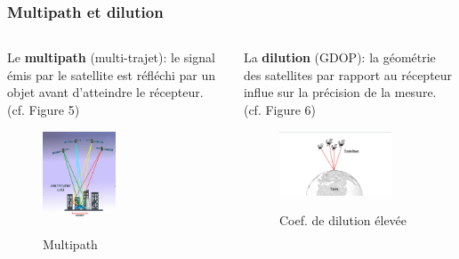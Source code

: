 \documentclass[xcolor=dvipsnames,envcountsect]{beamer}
\begin{document}
\begin{frame}
	\frametitle{Multipath et dilution}
	\justifying
	\begin{columns}
		\begin{column}{0.5\textwidth}
			Le \textbf{multipath} (multi-trajet): le signal émis par le satellite est réfléchi par un objet avant d'atteindre le récepteur. (cf. Figure 5)
			\begin{figure}
				\centering
				\includegraphics[width=0.5\textwidth]{./Figures/multipath.png} \\
				\caption {Multipath \cite{esa}}
			\end{figure}
		\end{column}
		\begin{column}{0.5\textwidth}
			La \textbf{dilution} (GDOP): la géométrie des satellites par rapport au récepteur influe sur la précision de la mesure. (cf. Figure 6)
			\begin{figure}
				\centering
				\includegraphics[width=0.8\textwidth]{./Figures/dilution.png} \\
				\caption {Coef. de dilution élevée \cite{esa}}
			\end{figure}
			
		\end{column}
	\end{columns}
\end{frame}
\end{document}

